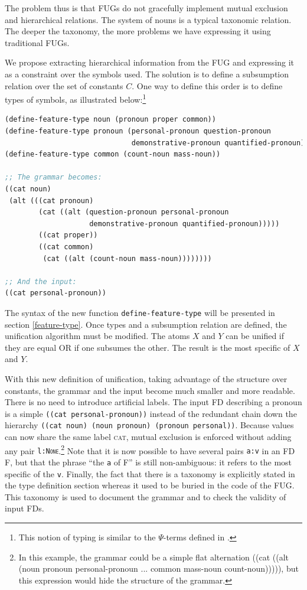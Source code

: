 \documentclass[10pt,a4paper]{report}
\begin{document}
The problem thus is that FUGs do not gracefully implement mutual exclusion
and hierarchical relations.  The system of nouns is a typical taxonomic
relation.  The deeper the taxonomy, the more problems we have expressing it
using traditional FUGs.

We propose extracting hierarchical information from the FUG and expressing
it as a constraint over the symbols used.  The solution is to define a
subsumption relation over the set of constants $C$.  One way to define
this order is to define types of symbols, as illustrated below:\footnote{This
notion of typing is similar to the $\Psi$-terms defined in \cite{Ait-kaci}.}

\begin{lstlisting}[language=Lisp]
(define-feature-type noun (pronoun proper common))
(define-feature-type pronoun (personal-pronoun question-pronoun 
                              demonstrative-pronoun quantified-pronoun))
(define-feature-type common (count-noun mass-noun))

;; The grammar becomes:
((cat noun)
 (alt (((cat pronoun)
		(cat ((alt (question-pronoun personal-pronoun 
					demonstrative-pronoun quantified-pronoun)))))
        ((cat proper))
        ((cat common)
		 (cat ((alt (count-noun mass-noun))))))))

;; And the input: 
((cat personal-pronoun))
\end{lstlisting}

The syntax of the new function {\tt define-feature-type} will be presented in
section \ref{feature-type}.  Once types and a subsumption relation are
defined, the unification algorithm must be modified.  The atoms $X$ and
$Y$ can be unified if they are equal OR if one subsumes the other.  The
result is the most specific of $X$ and $Y$.

With this new definition of unification, taking advantage of the structure
over constants, the grammar and the input become much smaller and more
readable.  There is no need to introduce artificial labels.  The input FD
describing a pronoun is a simple {\tt ((cat personal-pronoun))} instead of
the redundant chain down the hierarchy {\tt ((cat noun) (noun pronoun)
(pronoun personal))}.  Because values can now share the same label \textsc{cat},
mutual exclusion is enforced without adding any pair
{\tt {l:\textsc{None}}}.\footnote{In this example, the grammar could be a simple flat
alternation ((cat ((alt (noun pronoun personal-pronoun ...  common
mass-noun count-noun))))), but this expression would hide the structure of
the grammar.}  Note that it is now possible to have several pairs
{\tt {a:v}} in an FD F, but that the phrase ``the {\tt a} of F'' is still
non-ambiguous: it refers to the most specific of the {\tt v}.  Finally,
the fact that there is a taxonomy is explicitly stated in the type
definition section whereas it used to be buried in the code of the FUG.
This taxonomy is used to document the grammar and to check the validity of
input FDs.
\end{document}
